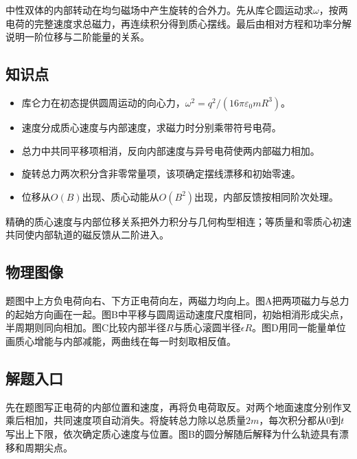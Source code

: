 \documentclass[UTF8,fontset=fandol,a4paper,11pt]{ctexart}
\begin{document}
中性双体的内部转动在均匀磁场中产生旋转的合外力。先从库仑圆运动求$\omega$，按两电荷的完整速度求总磁力，再连续积分得到质心摆线。最后由相对方程和功率分解说明一阶位移与二阶能量的关系。



\subsection*{知识点}

\begin{itemize}
\item 库仑力在初态提供圆周运动的向心力，$\omega^2=q^2/(16\pi\varepsilon_0mR^3)$。
\item 速度分成质心速度与内部速度，求磁力时分别乘带符号电荷。
\item 总力中共同平移项相消，反向内部速度与异号电荷使两内部磁力相加。
\item 旋转总力两次积分含非零常量项，该项确定摆线漂移和初始零速。
\item 位移从$O(B)$出现、质心动能从$O(B^2)$出现，内部反馈按相同阶次处理。
\end{itemize}
精确的质心速度与内部位移关系把外力积分与几何构型相连；等质量和零质心初速共同使内部轨道的磁反馈从二阶进入。



\subsection*{物理图像}

题图中上方负电荷向右、下方正电荷向左，两磁力均向上。图A把两项磁力与总力的起始方向画在一起。图B中平移与圆周运动速度尺度相同，初始相消形成尖点，半周期则同向相加。图C比较内部半径$R$与质心滚圆半径$\epsilon R$。图D用同一能量单位画质心增能与内部减能，两曲线在每一时刻取相反值。



\subsection*{解题入口}

先在题图写正电荷的内部位置和速度，再将负电荷取反。对两个地面速度分别作叉乘后相加，共同速度项自动消失。将旋转总力除以总质量$2m$，每次积分都从0到$t$写出上下限，依次确定质心速度与位置。图B的圆分解随后解释为什么轨迹具有漂移和周期尖点。
\end{document}
